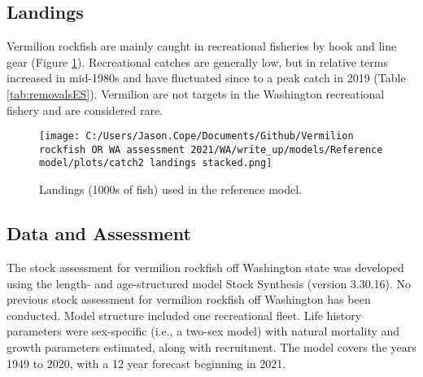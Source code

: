 \documentclass[11pt,
  english,
  a4paper,
]{article}
\begin{document}
\hypertarget{landings}{%
\subsection*{Landings}\label{landings}}

\leavevmode\tagmcend\tagstructend


Vermilion rockfish are mainly caught in recreational fisheries by hook and line gear (Figure \ref{fig:es-catch}). Recreational catches are generally low, but in relative terms increased in mid-1980s and have fluctuated since to a peak catch in 2019 (Table \ref{tab:removalsES}). Vermilion are not targets in the Washington recreational fishery and are considered rare.

\leavevmode\tagmcend\tagstructend\par

\clearpage




\begin{figure}
\centering
\texttt{[image: C:/Users/Jason.Cope/Documents/Github/Vermilion rockfish OR WA assessment 2021/WA/write\_up/models/Reference model/plots/catch2 landings stacked.png]}
\caption{Landings (1000s of fish) used in the reference model.\label{fig:es-catch}}
\end{figure}

\tagmcend\tagstructend

\clearpage


\hypertarget{data-and-assessment}{%
\subsection*{Data and Assessment}\label{data-and-assessment}}

\leavevmode\tagmcend\tagstructend


The stock assessment for vermilion rockfish off Washington state was developed using the length- and age-structured model Stock Synthesis (version 3.30.16). No previous stock assessment for vermilion rockfish off Washington has been conducted. Model structure included one recreational fleet. Life history parameters were sex-specific (i.e., a two-sex model) with natural mortality and growth parameters estimated, along with recruitment. The model covers the years 1949 to 2020, with a 12 year forecast beginning in 2021.
\end{document}
